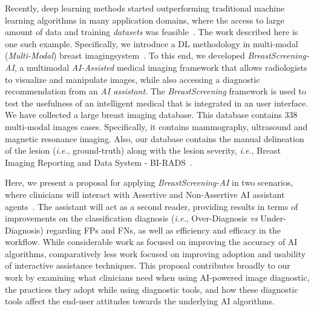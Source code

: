 Recently, deep learning methods started outperforming traditional machine learning algorithms in many application domains, where the access to large amount of data and training {\it datasets} was feasible~\cite{calisto2017mimbcdui}.
The work described here is one such example.
Specifically, we introduce a  DL methodology in multi-modal ({\it Multi-Modal}) breast imaging\footnotemark[1] system~\cite{https://doi.org/10.13140/rg.2.2.29816.70409}.
To this end, we developed {\it BreastScreening-AI}, a multimodal {\it AI-Assisted} medical imaging framework that allows radiologists to visualize and manipulate images, while also accessing a diagnostic recommendation from an {\it AI assistant}.
The {\it BreastScreening} framework is used to test the usefulness of an intelligent medical that is integrated in an user interface. 
We have collected a large breast imaging database. This database contains 338 multi-modal images cases. Specifically, it contains mammography, ultrasound and magnetic resonance imaging.
Also, our database contains the manual delineation of the lesion ({\it i.e.}, ground-truth) along with the lesion severity, {\it i.e.}, Breast Imaging Reporting and Data System - BI-RADS~\cite{ghosh2019artificial}.


Here, we present a proposal for applying {\it BreastScreening-AI} in two scenarios, where clinicians will interact with Assertive and Non-Assertive AI assistant agents~\cite{pacheco2019alignment, 10.1145/3311350.3347162}.
The assistant will act as a second reader, providing results in terms of improvements on the classification diagnosis ({\it i.e.}, Over-Diagnosis {\it vs} Under-Diagnosis) regarding FPs and FNs, as well as efficiency and efficacy in the workflow.
While considerable work as focused on improving the accuracy of AI algorithms, comparatively less work focused on improving adoption and usability of interactive assistance techniques.
This proposal contributes broadly to our work by examining what clinicians need when using AI-powered image diagnostic, the practices they adopt while using diagnostic tools, and how these diagnostic tools affect the end-user attitudes towards the underlying AI algorithms.